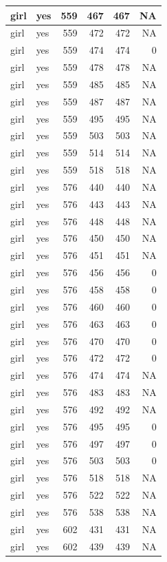 \documentclass[man]{apa6}
\begin{document}
\begin{tabular}{l|l|r|r|r|r}
\hline
girl & yes & 559 & 467 & 467 & NA\\
\hline
girl & yes & 559 & 472 & 472 & NA\\
\hline
girl & yes & 559 & 474 & 474 & 0\\
\hline
girl & yes & 559 & 478 & 478 & NA\\
\hline
girl & yes & 559 & 485 & 485 & NA\\
\hline
girl & yes & 559 & 487 & 487 & NA\\
\hline
girl & yes & 559 & 495 & 495 & NA\\
\hline
girl & yes & 559 & 503 & 503 & NA\\
\hline
girl & yes & 559 & 514 & 514 & NA\\
\hline
girl & yes & 559 & 518 & 518 & NA\\
\hline
girl & yes & 576 & 440 & 440 & NA\\
\hline
girl & yes & 576 & 443 & 443 & NA\\
\hline
girl & yes & 576 & 448 & 448 & NA\\
\hline
girl & yes & 576 & 450 & 450 & NA\\
\hline
girl & yes & 576 & 451 & 451 & NA\\
\hline
girl & yes & 576 & 456 & 456 & 0\\
\hline
girl & yes & 576 & 458 & 458 & 0\\
\hline
girl & yes & 576 & 460 & 460 & 0\\
\hline
girl & yes & 576 & 463 & 463 & 0\\
\hline
girl & yes & 576 & 470 & 470 & 0\\
\hline
girl & yes & 576 & 472 & 472 & 0\\
\hline
girl & yes & 576 & 474 & 474 & NA\\
\hline
girl & yes & 576 & 483 & 483 & NA\\
\hline
girl & yes & 576 & 492 & 492 & NA\\
\hline
girl & yes & 576 & 495 & 495 & 0\\
\hline
girl & yes & 576 & 497 & 497 & 0\\
\hline
girl & yes & 576 & 503 & 503 & 0\\
\hline
girl & yes & 576 & 518 & 518 & NA\\
\hline
girl & yes & 576 & 522 & 522 & NA\\
\hline
girl & yes & 576 & 538 & 538 & NA\\
\hline
girl & yes & 602 & 431 & 431 & NA\\
\hline
girl & yes & 602 & 439 & 439 & NA\\

\end{tabular}
\end{document}
